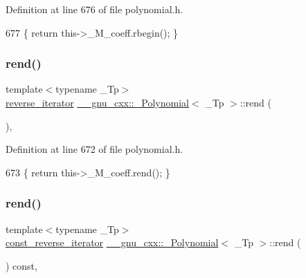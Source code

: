 Definition at line 676 of file polynomial.\+h.


\begin{DoxyCode}
677       \{ \textcolor{keywordflow}{return} this->\_M\_coeff.rbegin(); \}
\end{DoxyCode}
\mbox{\label{class____gnu__cxx_1_1__Polynomial_a8373c6b9a787a52798e4319906858d33}} 
\subsubsection{\texorpdfstring{rend()}{rend()}\hspace{0.1cm}{\footnotesize\ttfamily [1/2]}}
{\footnotesize\ttfamily template$<$typename \+\_\+\+Tp$>$ \\
\hyperlink{class____gnu__cxx_1_1__Polynomial_aed8f7d97c575d5c34c54170631953415}{reverse\+\_\+iterator} \hyperlink{class____gnu__cxx_1_1__Polynomial}{\+\_\+\+\_\+gnu\+\_\+cxx\+::\+\_\+\+Polynomial}$<$ \+\_\+\+Tp $>$\+::rend (\begin{DoxyParamCaption}{ }\end{DoxyParamCaption})\hspace{0.3cm}{\ttfamily [inline]}, {\ttfamily [noexcept]}}



Definition at line 672 of file polynomial.\+h.


\begin{DoxyCode}
673       \{ \textcolor{keywordflow}{return} this->\_M\_coeff.rend(); \}
\end{DoxyCode}
\mbox{\label{class____gnu__cxx_1_1__Polynomial_abeca4b1cffc4a52db34375b99b6d3d11}} 
\subsubsection{\texorpdfstring{rend()}{rend()}\hspace{0.1cm}{\footnotesize\ttfamily [2/2]}}
{\footnotesize\ttfamily template$<$typename \+\_\+\+Tp$>$ \\
\hyperlink{class____gnu__cxx_1_1__Polynomial_a2a042a80127ab9a7b0349a54791e59af}{const\+\_\+reverse\+\_\+iterator} \hyperlink{class____gnu__cxx_1_1__Polynomial}{\+\_\+\+\_\+gnu\+\_\+cxx\+::\+\_\+\+Polynomial}$<$ \+\_\+\+Tp $>$\+::rend (\begin{DoxyParamCaption}{ }\end{DoxyParamCaption}) const\hspace{0.3cm}{\ttfamily [inline]}, {\ttfamily [noexcept]}}



